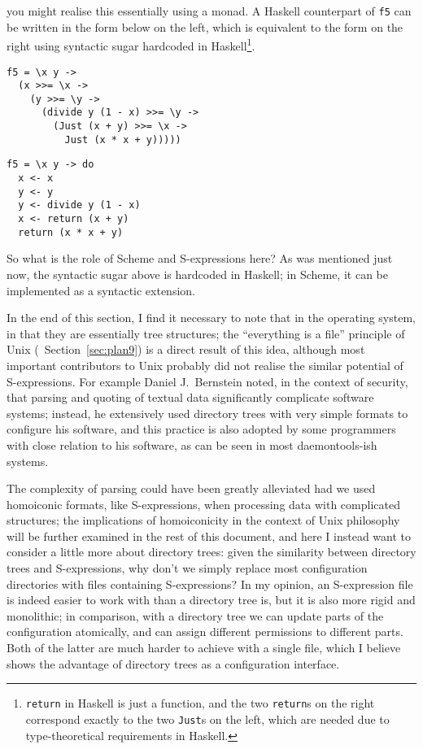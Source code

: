 you might realise this essentially using a monad.  A Haskell counterpart of
\verb|f5| can be written in the form below on the left, which is equivalent
to the form on the right using syntactic sugar hardcoded in Haskell\footnote%
{\texttt{return} in Haskell is just a function, and the two \texttt{return}s
on the right correspond exactly to the two \texttt{Just}s on the left,
which are needed due to type-theoretical requirements in Haskell.}.
\colskipa\begin{multicols}{2}
\begin{wquoting}
\begin{Verbatim}
f5 = \x y ->
  (x >>= \x ->
    (y >>= \y ->
      (divide y (1 - x) >>= \y ->
        (Just (x + y) >>= \x ->
          Just (x * x + y)))))
\end{Verbatim}
\end{wquoting}
\begin{wquoting}
\begin{Verbatim}
f5 = \x y -> do
  x <- x
  y <- y
  y <- divide y (1 - x)
  x <- return (x + y)
  return (x * x + y)
\end{Verbatim}
\end{wquoting}
\end{multicols}\colskipb\noindent%
So what is the role of Scheme and S-expressions here?  As was mentioned
just now, the syntactic sugar above is hardcoded in Haskell;
in Scheme, it can be implemented as a syntactic extension.

In the end of this section, I find it necessary to note that in the operating
system,  in that they are
essentially tree structures; the ``everything is a file'' principle of Unix
(\cf~Section~\ref{sec:plan9}) is a direct result of this idea, although
most important contributors to Unix probably did not realise the similar
potential of S-expressions.  For example Daniel J.\ Bernstein noted, in the
context of security, that parsing and quoting of textual data significantly
complicate software systems; instead, he extensively
used directory trees with very simple formats to configure his software, and
this practice is also adopted by some programmers with close relation
to his software, as can be seen in most daemontools-ish systems.

The complexity of parsing could have been greatly alleviated had we used
homoiconic formats, like S-expressions, when processing data with complicated
structures; the implications of homoiconicity in the context of Unix philosophy
will be further examined in the rest of this document, and here I instead
want to consider a little more about directory trees: given the similarity
between directory trees and S-expressions, why don't we simply replace most
configuration directories with files containing S-expressions?  In my opinion,
an S-expression file is indeed easier to work with than a directory tree is,
but it is also more rigid and monolithic; in comparison, with a directory
tree we can update parts of the configuration atomically, and can assign
different permissions to different parts.  Both of the latter are much
harder to achieve with a single file, which I believe shows the
advantage of directory trees as a configuration interface.

